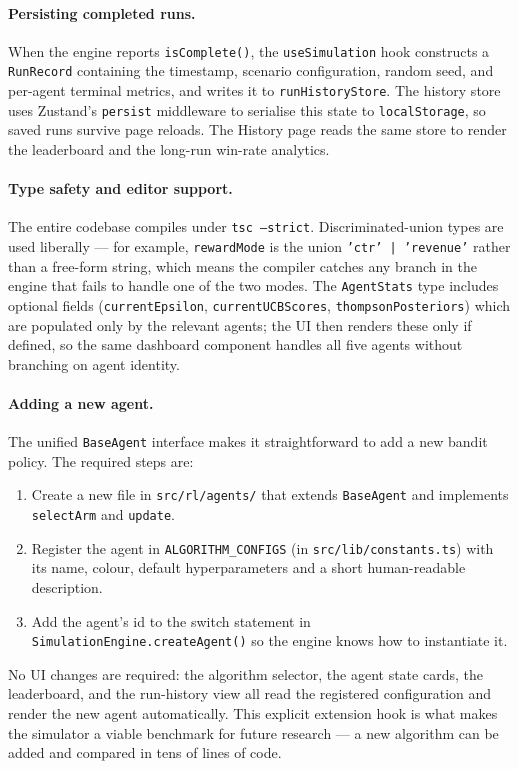 \paragraph{Persisting completed runs.}
When the engine reports \texttt{isComplete()}, the \texttt{useSimulation} hook constructs a \texttt{RunRecord} containing the timestamp, scenario configuration, random seed, and per-agent terminal metrics, and writes it to \texttt{runHistoryStore}. The history store uses Zustand's \texttt{persist} middleware to serialise this state to \texttt{localStorage}, so saved runs survive page reloads. The History page reads the same store to render the leaderboard and the long-run win-rate analytics.

\paragraph{Type safety and editor support.}
The entire codebase compiles under \texttt{tsc --strict}. Discriminated-union types are used liberally --- for example, \texttt{rewardMode} is the union \texttt{'ctr' | 'revenue'} rather than a free-form string, which means the compiler catches any branch in the engine that fails to handle one of the two modes. The \texttt{AgentStats} type includes optional fields (\texttt{currentEpsilon}, \texttt{currentUCBScores}, \texttt{thompsonPosteriors}) which are populated only by the relevant agents; the UI then renders these only if defined, so the same dashboard component handles all five agents without branching on agent identity.

\paragraph{Adding a new agent.}
The unified \texttt{BaseAgent} interface makes it straightforward to add a new bandit policy. The required steps are:
\begin{enumerate}\itemsep0pt
  \item Create a new file in \texttt{src/rl/agents/} that extends \texttt{BaseAgent} and implements \texttt{selectArm} and \texttt{update}.
  \item Register the agent in \texttt{ALGORITHM\_CONFIGS} (in \texttt{src/lib/constants.ts}) with its name, colour, default hyperparameters and a short human-readable description.
  \item Add the agent's id to the switch statement in \texttt{SimulationEngine.createAgent()} so the engine knows how to instantiate it.
\end{enumerate}
No UI changes are required: the algorithm selector, the agent state cards, the leaderboard, and the run-history view all read the registered configuration and render the new agent automatically. This explicit extension hook is what makes the simulator a viable benchmark for future research --- a new algorithm can be added and compared in tens of lines of code.


